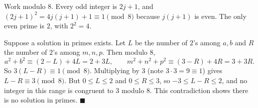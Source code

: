 Work modulo $8$. Every odd integer is $2j+1$, and $(2j+1)^2=4j(j+1)+1\equiv1\pmod8$ because $j(j+1)$ is even. The only even prime is $2$, with $2^2=4$.

Suppose a solution in primes exists. Let $L$ be the number of $2$'s among $a,b$ and $R$ the number of $2$'s among $m,n,p$. Then modulo $8$,
\[a^2+b^2\equiv(2-L)+4L=2+3L,\qquad m^2+n^2+p^2\equiv(3-R)+4R=3+3R.\]
So $3(L-R)\equiv1\pmod8$. Multiplying by $3$ (note $3\cdot3=9\equiv1$) gives $L-R\equiv3\pmod8$. But $0\le L\le2$ and $0\le R\le3$, so $-3\le L-R\le2$, and no integer in this range is congruent to $3$ modulo $8$. This contradiction shows there is no solution in primes. $\blacksquare$
